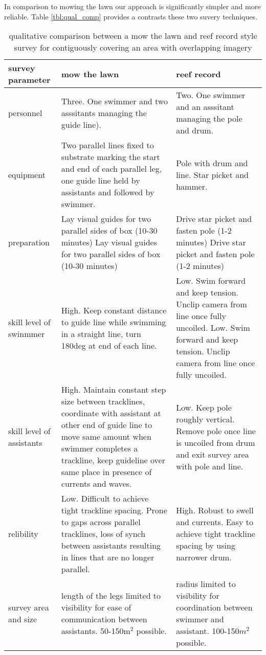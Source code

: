 In comparison to mowing the lawn \cite{Mahon_2011} our approach is significantly simpler and more reliable. Table \ref{tbl:qual_comp} provides a contrasts these two suvery techniques.
\begin{table} 
    \begin{tabular}{ | p{} | p{} | p{} |}
    \hline
survey parameter & mow the lawn & reef record \\
\hline
        personnel & Three. One swimmer and two asssitants managing the guide line). & Two. One swimmer and an asssitant managing the pole and drum. \\
        equipment & Two parallel lines fixed to substrate marking the start and end of each parallel leg, one guide line held by assistants and followed by swimmer.  & Pole with drum and line. Star picket and hammer.  \\ 
        \hline
        preparation & Lay visual guides for two parallel sides of box (10-30 minutes) Lay visual guides for two parallel sides of box (10-30 minutes) & Drive star picket and fasten pole (1-2 minutes) Drive star picket and fasten pole (1-2 minutes) \\ 
        \hline
        skill level of swinmmer & High. Keep constant distance to guide line while swimming in a straight line, turn 180deg at end of each line. & Low. Swim forward and keep tension. Unclip camera from line once fully uncoiled. Low. Swim forward and keep tension. Unclip camera from line once fully uncoiled. \\ 
        \hline
        skill level of assistants & High. Maintain constant step size between tracklines, coordinate with assistant at other end of guide line to move same amount when swimmer completes a trackline, keep guideline over same place in presence of currents and waves. & Low. Keep pole roughly vertical. Remove pole once line is uncoiled from drum and exit survey area with pole and line. \\
        \hline
        relibility & Low. Difficult to achieve tight trackline spacing. Prone to gaps across parallel tracklines, loss of synch between assistants resulting in lines that are no longer parallel. & High. Robust to swell and currents. Easy to achieve tight trackline spacing by using narrower drum. \\ 
        \hline
        survey area and size & length of the legs limited to visibility for ease of communication between assistants. 50-150m$^2$ possible.   & radius limited to visibility for coordination between swimmer and assistant. 100-150$m^2$ possible.    \\ 
        \hline
    \end{tabular} 
    \caption{qualitative comparison between a mow the lawn and reef record style survey for contiguously covering an area with overlapping imagery} 
\end{table}


